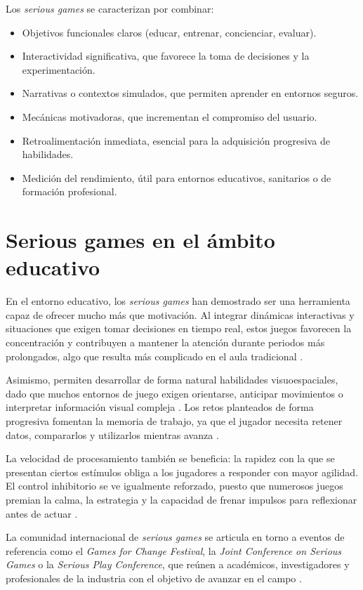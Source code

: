 \documentclass[12pt, a4paper]{report}
\begin{document}
Los \textit{serious games} se caracterizan por combinar:

\begin{itemize}
  \item Objetivos funcionales claros (educar, entrenar, concienciar, evaluar).
  \item Interactividad significativa, que favorece la toma de decisiones y la
    experimentación.
  \item Narrativas o contextos simulados, que permiten aprender en entornos
    seguros.
  \item Mecánicas motivadoras, que incrementan el compromiso del usuario.
  \item Retroalimentación inmediata, esencial para la adquisición progresiva
    de habilidades.
  \item Medición del rendimiento, útil para entornos educativos, sanitarios
    o de formación profesional.
\end{itemize}

\section{Serious games en el ámbito educativo}

En el entorno educativo, los \textit{serious games} han demostrado ser una
herramienta capaz de ofrecer mucho más que motivación. Al integrar dinámicas
interactivas y situaciones que exigen tomar decisiones en tiempo real, estos
juegos favorecen la concentración y contribuyen a mantener la atención durante
periodos más prolongados, algo que resulta más complicado en el aula tradicional
\citep{Bediou2018}.

Asimismo, permiten desarrollar de forma natural habilidades visuoespaciales,
dado que muchos entornos de juego exigen orientarse, anticipar movimientos o
interpretar información visual compleja \citep{GreenBavelier2003}. Los
retos planteados de forma progresiva fomentan la memoria de trabajo, ya que el
jugador necesita retener datos, compararlos y utilizarlos mientras avanza
\citep{Anguera2013}.

La velocidad de procesamiento también se beneficia: la rapidez con la que se
presentan ciertos estímulos obliga a los jugadores a responder con mayor agilidad.
El control inhibitorio se ve igualmente reforzado, puesto que numerosos juegos
premian la calma, la estrategia y la capacidad de frenar impulsos para reflexionar
antes de actuar \citep{Powers2013}.

La comunidad internacional de \textit{serious games} se articula en torno a
eventos de referencia como el \textit{Games for Change Festival}, la
\textit{Joint Conference on Serious Games} o la \textit{Serious Play Conference},
que reúnen a académicos, investigadores y profesionales de la industria con el
objetivo de avanzar en el campo \citep{GamesForChange,JCSG,SeriousPlay}.
\end{document}
